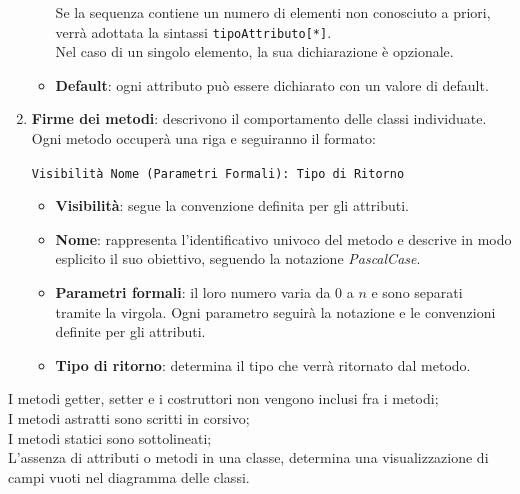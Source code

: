 \begin{enumerate}
\begin{itemize}
        Se la sequenza contiene un numero di elementi non conosciuto a priori, verrà adottata la sintassi \texttt{tipoAttributo[*]}. \\
        Nel caso di un singolo elemento, la sua dichiarazione è opzionale.
        \item \textbf{Default}: ogni attributo può essere dichiarato con un valore di default.
    \end{itemize}
    \item \textbf{Firme dei metodi}: descrivono il comportamento delle classi individuate. Ogni metodo occuperà una riga e seguiranno il formato: \\
    \begin{center} \texttt{Visibilità Nome (Parametri Formali): Tipo di Ritorno} \end{center}
    \begin{itemize}
        \item \textbf{Visibilità}: segue la convenzione definita per gli attributi.
        \item \textbf{Nome}: rappresenta l'identificativo univoco del metodo e descrive in modo esplicito il suo obiettivo, seguendo la notazione \textit{PascalCase}.
        \item \textbf{Parametri formali}: il loro numero varia da $0$ a $n$ e sono separati tramite la virgola. Ogni parametro seguirà la notazione e le convenzioni definite per gli attributi.
        \item \textbf{Tipo di ritorno}: determina il tipo che verrà ritornato dal metodo.
    \end{itemize}
\end{enumerate}

\vspace{15pt}

I metodi getter, setter e i costruttori non vengono inclusi fra i metodi;  \\
I metodi astratti sono scritti in corsivo; \\
I metodi statici sono sottolineati; \\
L'assenza di attributi o metodi in una classe, determina una visualizzazione di campi vuoti nel diagramma delle classi. \\ 

\vspace{15pt}

